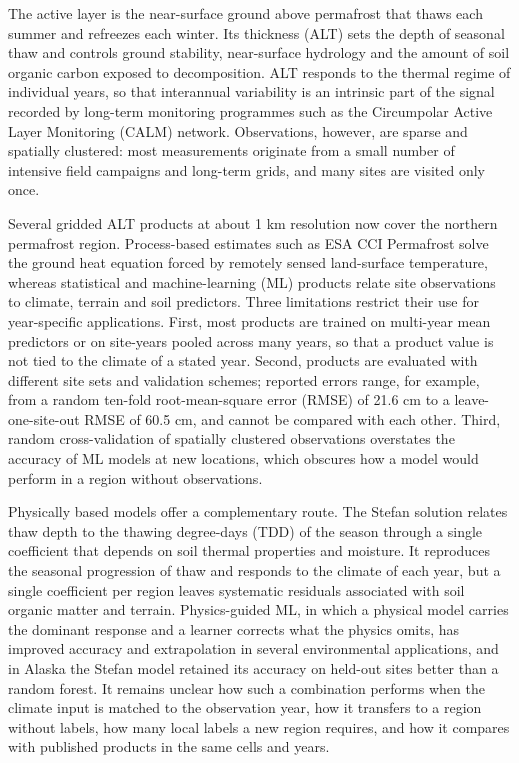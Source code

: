 The active layer is the near-surface ground above permafrost that thaws each summer and refreezes each winter. Its thickness (ALT) sets the depth of seasonal thaw and controls ground stability, near-surface hydrology and the amount of soil organic carbon exposed to decomposition\cite{Hjort2018,Schuur2015,Biskaborn2019}. ALT responds to the thermal regime of individual years, so that interannual variability is an intrinsic part of the signal recorded by long-term monitoring programmes such as the Circumpolar Active Layer Monitoring (CALM) network\cite{Nelson1997,Streletskiy2025}. Observations, however, are sparse and spatially clustered: most measurements originate from a small number of intensive field campaigns and long-term grids, and many sites are visited only once\cite{Moore2025,Veremeeva2025}.

Several gridded ALT products at about 1 km resolution now cover the northern permafrost region. Process-based estimates such as ESA CCI Permafrost solve the ground heat equation forced by remotely sensed land-surface temperature\cite{Westermann2024,Westermann2025}, whereas statistical and machine-learning (ML) products relate site observations to climate, terrain and soil predictors\cite{Aalto2018,Ran2022a,Liu2024,Wei2026}. Three limitations restrict their use for year-specific applications. First, most products are trained on multi-year mean predictors or on site-years pooled across many years, so that a product value is not tied to the climate of a stated year. Second, products are evaluated with different site sets and validation schemes; reported errors range, for example, from a random ten-fold root-mean-square error (RMSE) of 21.6 cm\cite{Liu2024} to a leave-one-site-out RMSE of 60.5 cm\cite{Wei2026}, and cannot be compared with each other. Third, random cross-validation of spatially clustered observations overstates the accuracy of ML models at new locations\cite{Roberts2017,Ploton2020,MeyerPebesma2022,Wadoux2021}, which obscures how a model would perform in a region without observations.

Physically based models offer a complementary route. The Stefan solution relates thaw depth to the thawing degree-days (TDD) of the season through a single coefficient that depends on soil thermal properties and moisture\cite{Stefan1891,Riseborough2008,Nelson1997}. It reproduces the seasonal progression of thaw and responds to the climate of each year, but a single coefficient per region leaves systematic residuals associated with soil organic matter and terrain. Physics-guided ML, in which a physical model carries the dominant response and a learner corrects what the physics omits, has improved accuracy and extrapolation in several environmental applications\cite{Willard2022,Read2019,Jia2021}, and in Alaska the Stefan model retained its accuracy on held-out sites better than a random forest\cite{Gautam2025}. It remains unclear how such a combination performs when the climate input is matched to the observation year, how it transfers to a region without labels, how many local labels a new region requires, and how it compares with published products in the same cells and years.

